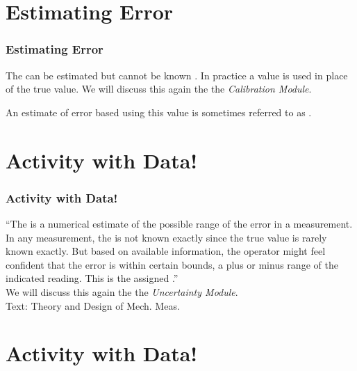 \documentclass[fleqn]{beamer} %
\newcommand{\sectiontitleII}{Estimating Error}
\newcommand{\sectiontitleIV}{Activity with Data!}
\begin{document}
\section{\sectiontitleII}

	\begin{frame}[label=sectionII]
		\frametitle{\sectiontitleII}

		The \hspcu \hspc \hspcu can be estimated but cannot be known  \hspcu. In practice a \hspcu value is used in place of the true value. We will discuss this again the the {\it Calibration Module}.

		\begin{framed}%
		\end{framed}

		An estimate of error based using this value is sometimes referred to as \hspcu \hspc \hspcu. \vspc
	\end{frame}

\section{\sectiontitleIV}

\begin{frame}[label=sectionIV]
	\frametitle{\sectiontitleIV}

	``The \hspcu is a numerical estimate of the possible range of the error in a measurement. In any
	measurement, the \hspcu is not known exactly since the true value is rarely known exactly. But based on
	available information, the operator might feel confident that the error is within certain bounds, a plus
	or minus range of the indicated reading. This is the assigned \hspcu.''\vspace{5mm}\\
	We will discuss this again the the {\it Uncertainty Module}.\vspace{10mm}\\

	{\tiny Text: Theory and Design of Mech. Meas.}
\end{frame}

\section{\sectiontitleIV}
\end{document}
